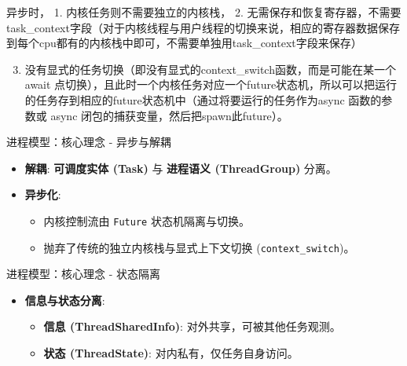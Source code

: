 \documentclass[
  ignorenonframetext,
]{beamer}
\providecommand{\tightlist}{%
  \setlength{\itemsep}{0pt}\setlength{\parskip}{0pt}}
\begin{document}
\begin{frame}[fragile]
异步时， 1. 内核任务则不需要独立的内核栈， 2.
无需保存和恢复寄存器，不需要task\_context字段（对于内核线程与用户线程的切换来说，相应的寄存器数据保存到每个cpu都有的内核栈中即可，不需要单独用task\_context字段来保存）

\begin{enumerate}
\setcounter{enumi}{2}
\tightlist
\item
  没有显式的任务切换（即没有显式的context\_switch函数，而是可能在某一个
  await
  点切换），且此时一个内核任务对应一个future状态机，所以可以把运行的任务存到相应的future状态机中（通过将要运行的任务作为async
  函数的参数或 async 闭包的捕获变量，然后把spawn此future）。
\end{enumerate}

\begin{block}{进程模型：核心理念 - 异步与解耦}
\label{ux8fdbux7a0bux6a21ux578bux6838ux5fc3ux7406ux5ff5---ux5f02ux6b65ux4e0eux89e3ux8026}
\begin{itemize}
\tightlist
\item
  \textbf{解耦}: \textbf{可调度实体 (Task)} 与 \textbf{进程语义
  (ThreadGroup)} 分离。
\item
  \textbf{异步化}:

  \begin{itemize}
  \tightlist
  \item
    内核控制流由 \texttt{Future} 状态机隔离与切换。
  \item
    抛弃了传统的独立内核栈与显式上下文切换 (\texttt{context\_switch})。
  \end{itemize}
\end{itemize}
\end{block}
\end{frame}

\begin{frame}
\begin{block}{进程模型：核心理念 - 状态隔离}
\label{ux8fdbux7a0bux6a21ux578bux6838ux5fc3ux7406ux5ff5---ux72b6ux6001ux9694ux79bb}
\begin{itemize}
\tightlist
\item
  \textbf{信息与状态分离}:

  \begin{itemize}
  \tightlist
  \item
    \textbf{信息 (ThreadSharedInfo)}: 对外共享，可被其他任务观测。
  \item
    \textbf{状态 (ThreadState)}: 对内私有，仅任务自身访问。
  \end{itemize}
\end{itemize}
\end{block}
\end{frame}
\end{document}
